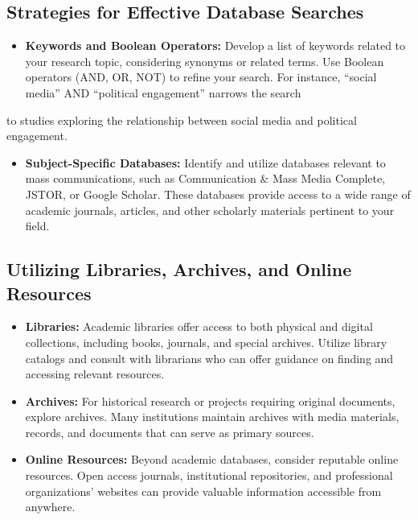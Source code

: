 \documentclass[
]{book}
\providecommand{\tightlist}{%
  \setlength{\itemsep}{0pt}\setlength{\parskip}{0pt}}
\begin{document}
\hypertarget{strategies-for-effective-database-searches}{%
\subsection*{Strategies for Effective Database Searches}\label{strategies-for-effective-database-searches}}

\begin{itemize}
\tightlist
\item
  \textbf{Keywords and Boolean Operators:} Develop a list of keywords related to your research topic, considering synonyms or related terms. Use Boolean operators (AND, OR, NOT) to refine your search. For instance, ``social media'' AND ``political engagement'' narrows the search
\end{itemize}

to studies exploring the relationship between social media and political engagement.

\begin{itemize}
\tightlist
\item
  \textbf{Subject-Specific Databases:} Identify and utilize databases relevant to mass communications, such as Communication \& Mass Media Complete, JSTOR, or Google Scholar. These databases provide access to a wide range of academic journals, articles, and other scholarly materials pertinent to your field.
\end{itemize}

\hypertarget{utilizing-libraries-archives-and-online-resources}{%
\subsection*{Utilizing Libraries, Archives, and Online Resources}\label{utilizing-libraries-archives-and-online-resources}}

\begin{itemize}
\item
  \textbf{Libraries:} Academic libraries offer access to both physical and digital collections, including books, journals, and special archives. Utilize library catalogs and consult with librarians who can offer guidance on finding and accessing relevant resources.
\item
  \textbf{Archives:} For historical research or projects requiring original documents, explore archives. Many institutions maintain archives with media materials, records, and documents that can serve as primary sources.
\item
  \textbf{Online Resources:} Beyond academic databases, consider reputable online resources. Open access journals, institutional repositories, and professional organizations' websites can provide valuable information accessible from anywhere.
\end{itemize}
\end{document}
